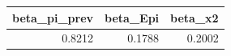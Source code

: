 \begin{tabular}{rrr}
\toprule
beta_pi_prev & beta_Epi & beta_x2 \\
\midrule
0.8212 & 0.1788 & 0.2002 \\
\bottomrule
\end{tabular}
